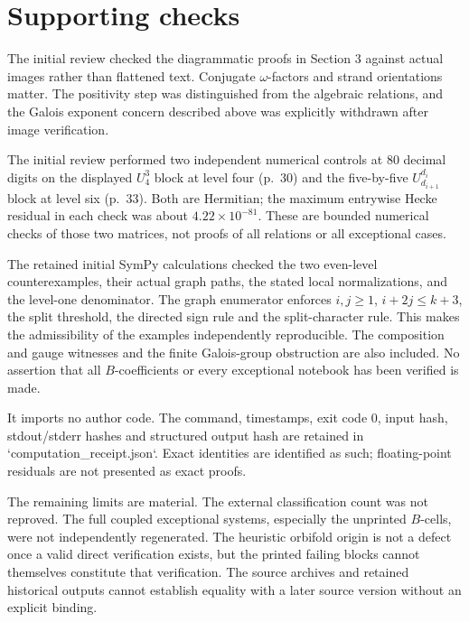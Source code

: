 \documentclass[10pt]{article}
\begin{document}
\section*{Supporting checks}
The initial review checked the diagrammatic proofs in Section 3 against actual images rather than flattened text. Conjugate \(\omega\)-factors and strand orientations matter. The positivity step was distinguished from the algebraic relations, and the Galois exponent concern described above was explicitly withdrawn after image verification.\par
The initial review performed two independent numerical controls at 80 decimal digits on the displayed \(U^3_4\) block at level four (p. 30) and the five-by-five \(U^{d_i}_{d_{i+1}}\) block at level six (p. 33). Both are Hermitian; the maximum entrywise Hecke residual in each check was about \(4.22\times10^{-81}\). These are bounded numerical checks of those two matrices, not proofs of all relations or all exceptional cases.\par
The retained initial SymPy calculations checked the two even-level counterexamples, their actual graph paths, the stated local normalizations, and the level-one denominator. The graph enumerator enforces \(i,j\ge1\), \(i+2j\le k+3\), the split threshold, the directed sign rule and the split-character rule. This makes the admissibility of the examples independently reproducible. The composition and gauge witnesses and the finite Galois-group obstruction are also included. No assertion that all \(B\)-coefficients or every exceptional notebook has been verified is made.\par
It imports no author code. The command, timestamps, exit code \(0\), input hash, stdout/stderr hashes and structured output hash are retained in `computation\_receipt.json`. Exact identities are identified as such; floating-point residuals are not presented as exact proofs.\par
The remaining limits are material. The external classification count was not reproved. The full coupled exceptional systems, especially the unprinted \(B\)-cells, were not independently regenerated. The heuristic orbifold origin is not a defect once a valid direct verification exists, but the printed failing blocks cannot themselves constitute that verification. The source archives and retained historical outputs cannot establish equality with a later source version without an explicit binding.\par
\end{document}
